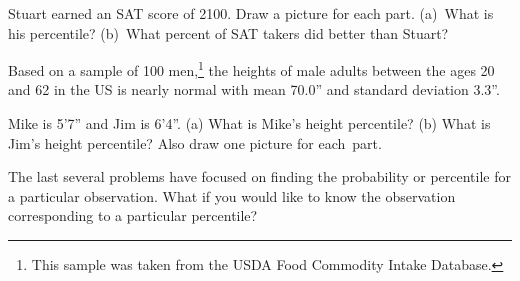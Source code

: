 \begin{exercisewrap}
\begin{nexercise}
Stuart earned an SAT score of 2100. Draw a picture for each part. (a)~What is his percentile? (b)~What percent of SAT takers did better than Stuart?\footnotemark
\end{nexercise}
\end{exercisewrap}

Based on a sample of 100 men,\footnote{This sample was taken from the USDA Food Commodity Intake Database.} the heights of male adults between the ages 20 and 62 in the US is nearly normal with mean 70.0'' and standard deviation 3.3''.

\begin{exercisewrap}
\begin{nexercise}
Mike is 5'7'' and Jim is 6'4''. (a) What is Mike's height percentile? (b) What is Jim's height percentile? Also draw one picture for each~part.\footnotemark
\end{nexercise}
\end{exercisewrap}

The last several problems have focused on finding the probability or percentile for a particular observation. What if you would like to know the observation corresponding to a particular percentile?

